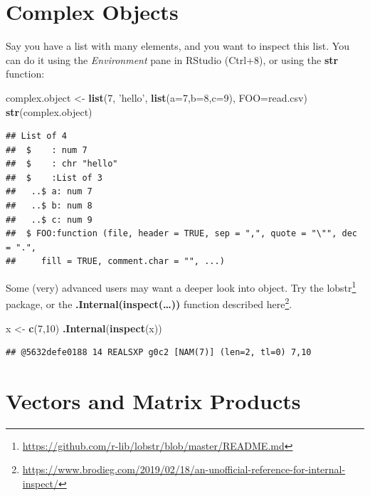 \documentclass[]{book}
\newenvironment{Shaded}{\begin{snugshade}}{\end{snugshade}}
\newcommand{\DataTypeTok}[1]{\textcolor[rgb]{0.13,0.29,0.53}{#1}}
\newcommand{\DecValTok}[1]{\textcolor[rgb]{0.00,0.00,0.81}{#1}}
\newcommand{\KeywordTok}[1]{\textcolor[rgb]{0.13,0.29,0.53}{\textbf{#1}}}
\newcommand{\NormalTok}[1]{#1}
\newcommand{\StringTok}[1]{\textcolor[rgb]{0.31,0.60,0.02}{#1}}
\renewcommand{\href}[2]{#2\footnote{\url{#1}}}
\theoremstyle{definition}
\theoremstyle{definition}
\theoremstyle{definition}
\theoremstyle{remark}
\begin{document}
\hypertarget{complex-objects}{%
\section{Complex Objects}\label{complex-objects}}

Say you have a list with many elements, and you want to inspect this list.
You can do it using the \emph{Environment} pane in RStudio (Ctrl+8), or using the \textbf{str} function:

\begin{Shaded}
\begin{Highlighting}[]
\NormalTok{complex.object <-}\StringTok{ }\KeywordTok{list}\NormalTok{(}\DecValTok{7}\NormalTok{, }\StringTok{'hello'}\NormalTok{, }\KeywordTok{list}\NormalTok{(}\DataTypeTok{a=}\DecValTok{7}\NormalTok{,}\DataTypeTok{b=}\DecValTok{8}\NormalTok{,}\DataTypeTok{c=}\DecValTok{9}\NormalTok{), }\DataTypeTok{FOO=}\NormalTok{read.csv)}
\KeywordTok{str}\NormalTok{(complex.object)}
\end{Highlighting}
\end{Shaded}

\begin{verbatim}
## List of 4
##  $    : num 7
##  $    : chr "hello"
##  $    :List of 3
##   ..$ a: num 7
##   ..$ b: num 8
##   ..$ c: num 9
##  $ FOO:function (file, header = TRUE, sep = ",", quote = "\"", dec = ".", 
##     fill = TRUE, comment.char = "", ...)
\end{verbatim}

Some (very) advanced users may want a deeper look into object.
Try the \href{https://github.com/r-lib/lobstr/blob/master/README.md}{lobstr} package, or the \textbf{.Internal(inspect(\ldots{}))} function described \href{https://www.brodieg.com/2019/02/18/an-unofficial-reference-for-internal-inspect/}{here}.

\begin{Shaded}
\begin{Highlighting}[]
\NormalTok{x <-}\StringTok{ }\KeywordTok{c}\NormalTok{(}\DecValTok{7}\NormalTok{,}\DecValTok{10}\NormalTok{)}
\KeywordTok{.Internal}\NormalTok{(}\KeywordTok{inspect}\NormalTok{(x))}
\end{Highlighting}
\end{Shaded}

\begin{verbatim}
## @5632defe0188 14 REALSXP g0c2 [NAM(7)] (len=2, tl=0) 7,10
\end{verbatim}

\hypertarget{vectors-and-matrix-products}{%
\section{Vectors and Matrix Products}\label{vectors-and-matrix-products}}
\end{document}
